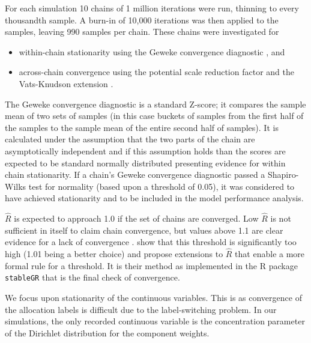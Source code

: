 \documentclass[]{article}
\begin{document}
For each simulation 10 chains of 1 million iterations were run, thinning to every thousandth sample. A burn-in of 10,000 iterations was then applied to the samples, leaving 990 samples per chain. These chains were investigated for 
\begin{itemize}
	\item within-chain stationarity using the Geweke convergence diagnostic \citep{geweke1991evaluating}, and
	\item across-chain convergence using the potential scale reduction factor \citep[$\hat{R}$, ][]{gelman1992inference} and the Vats-Knudson extension \citep[\emph{stable $\hat{R}$},][]{vats2018revisiting}.
\end{itemize}
The Geweke convergence diagnostic is a standard Z-score; it compares the sample mean of two sets of samples (in this case buckets of samples from the first half of the samples to the sample mean of the entire second half of samples). It is calculated under the assumption that the two parts of the chain are asymptotically independent and if this assumption holds than the scores are expected to be standard normally distributed presenting evidence for within chain stationarity. If a chain's Geweke convergence diagnostic passed a Shapiro-Wilks test for normality \citep{shapiro1965analysis} (based upon a threshold of 0.05), it was considered to have achieved stationarity and to be included in the model performance analysis. 

$\hat{R}$ is expected to approach 1.0 if the set of chains are converged. Low $\hat{R}$ is not sufficient in itself to claim chain convergence, but values above 1.1 are clear evidence for a lack of convergence \citep{gelman2013bayesian}. \cite{vats2018revisiting} show that this threshold is significantly too high (1.01 being a better choice) and propose extensions to $\hat{R}$ that enable a more formal rule for a threshold. It is their method as implemented in the R package \texttt{stableGR} \citep{knudson20202stableGR} that is the final check of convergence.

We focus upon stationarity of the continuous variables. This is as convergence of the allocation labels is difficult due to the label-switching problem. In our simulations, the only recorded continuous variable is the concentration parameter of the Dirichlet distribution for the component weights. 
\end{document}
